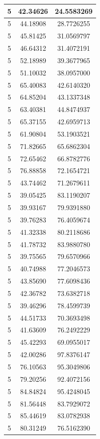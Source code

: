 \documentclass[
]{book}
\begin{document}
\begin{tabular}{c|c|c}
\hline
5 & 42.34626 & 24.5583269\\
\hline
5 & 44.18908 & 28.7726255\\
\hline
5 & 45.81425 & 31.0569797\\
\hline
5 & 46.64312 & 31.4072191\\
\hline
5 & 52.18989 & 39.3677965\\
\hline
5 & 51.10032 & 38.0957000\\
\hline
5 & 65.40083 & 42.6140320\\
\hline
5 & 64.85204 & 43.1337348\\
\hline
5 & 63.40381 & 44.8474937\\
\hline
5 & 65.37155 & 42.6959713\\
\hline
5 & 61.90804 & 53.1903521\\
\hline
5 & 71.82665 & 65.6862304\\
\hline
5 & 72.65462 & 66.8782776\\
\hline
5 & 76.88858 & 72.1654721\\
\hline
5 & 43.74462 & 71.2679611\\
\hline
5 & 39.05425 & 83.1190207\\
\hline
5 & 39.93167 & 79.9391880\\
\hline
5 & 39.76283 & 76.4059674\\
\hline
5 & 41.32338 & 80.2118686\\
\hline
5 & 41.78732 & 83.9880780\\
\hline
5 & 39.75565 & 79.6570966\\
\hline
5 & 40.74988 & 77.2046573\\
\hline
5 & 43.85690 & 77.6098436\\
\hline
5 & 42.36782 & 73.6382718\\
\hline
5 & 39.46296 & 78.4599739\\
\hline
5 & 44.51733 & 70.3693498\\
\hline
5 & 41.63609 & 76.2492229\\
\hline
5 & 45.42293 & 69.0955017\\
\hline
5 & 42.00286 & 97.8376147\\
\hline
5 & 76.10563 & 95.3049806\\
\hline
5 & 79.20256 & 92.4072156\\
\hline
5 & 84.84824 & 95.4248045\\
\hline
5 & 81.56448 & 83.7929072\\
\hline
5 & 85.44619 & 83.0782938\\
\hline
5 & 80.31249 & 76.5162390\\

\end{tabular}
\end{document}
